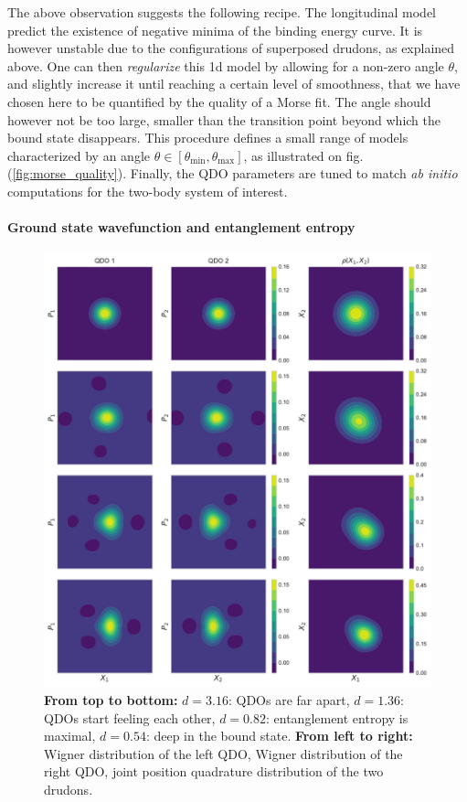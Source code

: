 \documentclass[reprint, amsmath, amssymb, aps, pra]{revtex4-2}
\begin{document}
    The above observation suggests the following recipe. The longitudinal model predict the existence of negative minima of the binding energy curve. It is however unstable due to the configurations of superposed drudons, as explained above. One can then \textit{regularize} this 1d model by allowing for a non-zero angle $\theta$, and slightly increase it until reaching a certain level of smoothness, that we have chosen here to be quantified by the quality of a Morse fit. The angle should however not be too large, smaller than the transition point beyond which the bound state disappears. This procedure defines a small range of models characterized by an angle $\theta\in[\theta_\text{min}, \theta_\text{max}]$, as illustrated on fig. (\ref{fig:morse_quality}). Finally, the QDO parameters are tuned to match \textit{ab initio} computations for the two-body system of interest.
    \newline
\paragraph*{Ground state wavefunction and entanglement entropy}

    \begin{figure}
        \includegraphics[scale=0.75]{figures/wigners_joint.pdf}
        \caption{\label{fig:wigners_joint}\textbf{From top to bottom:} $d=3.16$: QDOs are far apart, $d=1.36$: QDOs start feeling each other, $d=0.82$: entanglement entropy is maximal, $d=0.54$: deep in the bound state. \textbf{From left to right:} Wigner distribution of the left QDO, Wigner distribution of the right QDO, joint position quadrature distribution of the two drudons.}
    \end{figure}
\end{document}
